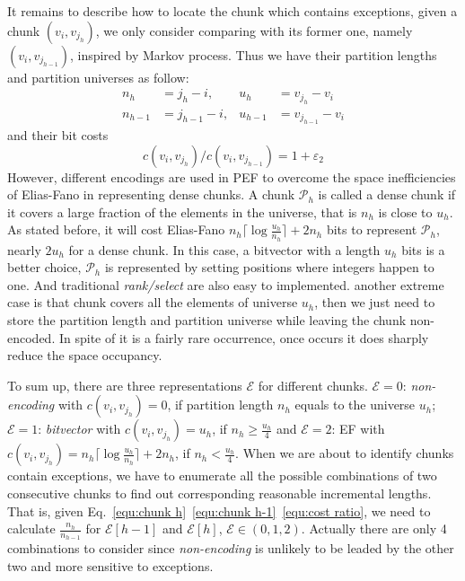 \documentclass[runningheads,a4paper]{llncs}
\begin{document}
It remains to describe how to locate the chunk which contains exceptions, given a chunk $\left(v_{i},v_{j_{h}}\right)$, we only consider comparing with its former one, namely $\left(v_{i},v_{j_{h-1}}\right)$, inspired by Markov process.
Thus we have their partition lengths and partition universes as follow:
\begin{align}
n_{h} &= j_{h}-i, & u_{h} &= v_{j_{h}} - v_{i} \label{equ:chunk h}\\
n_{h-1} &= j_{h-1}-i, & u_{h-1} &= v_{j_{h-1}} - v_{i}\label{equ:chunk h-1}
\end{align}
and their bit costs
\begin{equation}\label{equ:cost ratio}
{c\left(v_{i},v_{j_{h}}\right)}/{c\left(v_{i},v_{j_{h-1}}\right)}=1+\varepsilon_{2}
\end{equation}
However, different encodings are used in PEF to overcome the space inefficiencies of Elias-Fano in representing dense chunks.
A chunk $ \mathcal{P}_{h} $ is called a dense chunk if it covers a large fraction of the elements in the universe, that is $ n_{h} $ is close to $ u_{h} $.
As stated before, it will cost Elias-Fano $ n_{h} \lceil \log \frac{u_{h}}{n_{h}} \rceil + 2 n_{h} $ bits to represent $ \mathcal{P}_{h} $, nearly $ 2 u_{h} $ for a dense chunk.
In this case, a bitvector with a length $ u_{h} $ bits is a better choice, $ \mathcal{P}_{h} $ is represented by setting positions where integers happen to one.
And traditional \textit{rank/select} are also easy to implemented.
another extreme case is that chunk covers all the elements of universe $ u_{h} $, then we just need to store the partition length and partition universe while leaving the chunk non-encoded.
In spite of it is a fairly rare occurrence, once occurs it does sharply reduce the space occupancy.

To sum up, there are three representations $ \mathcal{E} $ for different chunks.
$ \mathcal{E}=0 $: \textit{non-encoding} with $c\left(v_{i},v_{j_{h}}\right)=0$, if partition length $n_{h}$ equals to the universe $u_{h}$; $ \mathcal{E}=1 $: \textit{bitvector} with $c\left(v_{i},v_{j_{h}}\right)=u_{h}$, if $n_{h}\geqslant \frac{u_{h}}{4}$ and $ \mathcal{E}=2 $: EF with $c\left(v_{i},v_{j_{h}}\right)=n_{h}\lceil\log \frac{u_{h}}{n_{h}}\rceil+2n_{h}$, if $n_{h}<\frac{u_{h}}{4}$.
When we are about to identify chunks contain exceptions, we have to enumerate all the possible combinations of two consecutive chunks to find out corresponding reasonable incremental lengths.
That is, given Eq.~\eqref{equ:chunk h}~\eqref{equ:chunk h-1}~\eqref{equ:cost ratio}, we need to calculate $ \frac{n_h}{n_{h-1}} $ for $ \mathcal{E}[h-1] $ and $ \mathcal{E}[h] $, $ \mathcal{E} \in (0,1,2) $.
Actually there are only 4 combinations to consider since \textit{non-encoding} is unlikely to be leaded by the other two and more sensitive to exceptions.
\end{document}
